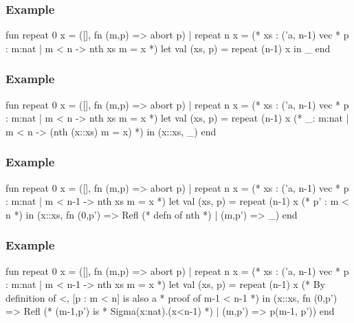 \documentclass[usenames,dvipsnames]{beamer}
\begin{document}

\begin{frame}[fragile]
  \frametitle{Example}

  \begin{code}
    fun repeat 0 x = ([], fn (m,p) => abort p)
      | repeat n x =
          (* xs : ('a, n-1) vec
           * p : {m:nat | m < n} -> nth xs m = x
           *)
          let val (xs, p) = repeat (n-1) x
           in _
          end
  \end{code}
\end{frame}


\begin{frame}[fragile]
  \frametitle{Example}

  \begin{code}
    fun repeat 0 x = ([], fn (m,p) => abort p)
      | repeat n x =
          (* xs : ('a, n-1) vec
           * p : {m:nat | m < n} -> nth xs m = x
           *)
          let val (xs, p) = repeat (n-1) x
           (* _: {m:nat | m < n} -> (nth (x::xs) m = x) *)
           in (x::xs, _)
          end
  \end{code}
\end{frame}


\begin{frame}[fragile]
  \frametitle{Example}

  \begin{code}
    fun repeat 0 x = ([], fn (m,p) => abort p)
      | repeat n x =
          (* xs : ('a, n-1) vec
           * p : {m:nat | m < n-1} -> nth xs m = x
           *)
          let val (xs, p) = repeat (n-1) x
          (* p' : m < n *)
           in (x::xs, fn (0,p') => Refl (* defn of nth *)
                       | (m,p') => _)
          end
  \end{code}
\end{frame}


\begin{frame}[fragile]
  \frametitle{Example}

  \begin{code}
    fun repeat 0 x = ([], fn (m,p) => abort p)
      | repeat n x =
          (* xs : ('a, n-1) vec
           * p : {m:nat | m < n-1} -> nth xs m = x
           *)
          let val (xs, p) = repeat (n-1) x
          (* By definition of <, [p : m < n] is also a
           * proof of m-1 < n-1
           *)
           in (x::xs, fn (0,p') => Refl
                                   (* (m-1,p') is
                                    * Sigma(x:nat).(x<n-1)
                                    *)
                       | (m,p') => p(m-1, p'))
          end
  \end{code}
\end{frame}

\end{document}
